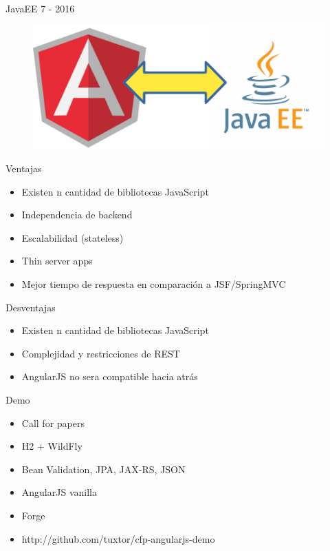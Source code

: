 \documentclass{beamer}
\begin{document}
\begin{frame}{JavaEE 7 - 2016}
	\begin{figure}
		\centering
		\includegraphics[width=0.8\linewidth]{Images/anguaree.png}
	\end{figure}
\end{frame}


\begin{frame}{Ventajas}
	\begin{itemize}
		\item Existen n cantidad de bibliotecas JavaScript
		\item Independencia de backend
		\item Escalabilidad (stateless)
		\item Thin server apps
		\item Mejor tiempo de respuesta en comparación a JSF/SpringMVC
	\end{itemize}
\end{frame}

\begin{frame}{Desventajas}
	\begin{itemize}
		\item Existen n cantidad de bibliotecas JavaScript
		\item Complejidad y restricciones de REST
		\item AngularJS no sera compatible hacia atrás
	\end{itemize}
\end{frame}

\begin{frame}{Demo}
	\begin{itemize}
		\item Call for papers
		\item H2 + WildFly
		\item Bean Validation, JPA, JAX-RS, JSON
		\item AngularJS vanilla
		\item Forge
		\item http://github.com/tuxtor/cfp-angularjs-demo
	\end{itemize}
\end{frame}
\end{document}
